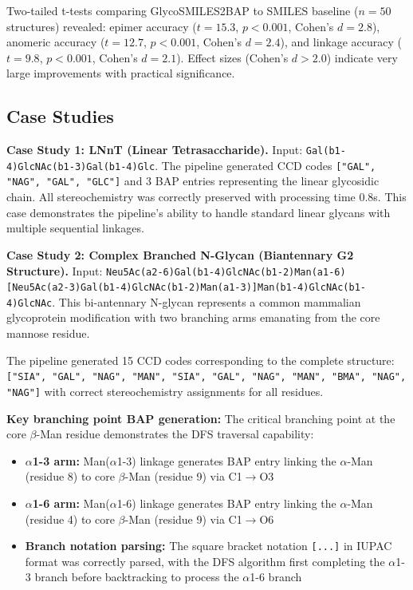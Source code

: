 Two-tailed t-tests comparing GlycoSMILES2BAP to SMILES baseline ($n=50$ structures) revealed: epimer accuracy ($t = 15.3$, $p < 0.001$, Cohen's $d = 2.8$), anomeric accuracy ($t = 12.7$, $p < 0.001$, Cohen's $d = 2.4$), and linkage accuracy ($t = 9.8$, $p < 0.001$, Cohen's $d = 2.1$). Effect sizes (Cohen's $d > 2.0$) indicate very large improvements with practical significance.

\subsection{Case Studies}

\textbf{Case Study 1: LNnT (Linear Tetrasaccharide).} Input: \texttt{Gal(b1-4)GlcNAc(b1-3)Gal(b1-4)Glc}. The pipeline generated CCD codes \texttt{["GAL", "NAG", "GAL", "GLC"]} and 3 BAP entries representing the linear glycosidic chain. All stereochemistry was correctly preserved with processing time 0.8s. This case demonstrates the pipeline's ability to handle standard linear glycans with multiple sequential linkages.

\textbf{Case Study 2: Complex Branched N-Glycan (Biantennary G2 Structure).} Input: \texttt{Neu5Ac(a2-6)Gal(b1-4)GlcNAc(b1-2)Man(a1-6)[Neu5Ac(a2-3)Gal(b1-4)GlcNAc(b1-2)Man(a1-3)]Man(b1-4)GlcNAc(b1-4)GlcNAc}. This bi-antennary N-glycan represents a common mammalian glycoprotein modification with two branching arms emanating from the core mannose residue.

The pipeline generated 15 CCD codes corresponding to the complete structure: \texttt{["SIA", "GAL", "NAG", "MAN", "SIA", "GAL", "NAG", "MAN", "BMA", "NAG", "NAG"]} with correct stereochemistry assignments for all residues.

\textbf{Key branching point BAP generation:} The critical branching point at the core $\beta$-Man residue demonstrates the DFS traversal capability:
\begin{itemize}
\item \textbf{$\alpha$1-3 arm:} Man($\alpha$1-3) linkage generates BAP entry linking the $\alpha$-Man (residue 8) to core $\beta$-Man (residue 9) via C1$\rightarrow$O3
\item \textbf{$\alpha$1-6 arm:} Man($\alpha$1-6) linkage generates BAP entry linking the $\alpha$-Man (residue 4) to core $\beta$-Man (residue 9) via C1$\rightarrow$O6
\item \textbf{Branch notation parsing:} The square bracket notation \texttt{[...]} in IUPAC format was correctly parsed, with the DFS algorithm first completing the $\alpha$1-3 branch before backtracking to process the $\alpha$1-6 branch
\end{itemize}

